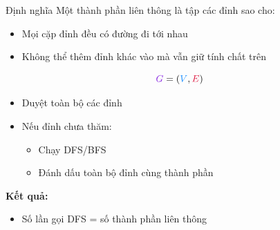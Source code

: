 \documentclass{beamer}
\title{\hlred{Thành phần liên thông}}
\author{Group 3}
\date{\hlcyan{03/2026}}
\newcommand{\hlblue}[1]{\textcolor{myblue}{#1}}
\newcommand{\hlgreen}[1]{\textcolor{mygreen}{#1}}
\newcommand{\hlred}[1]{\textcolor{myred}{#1}}
\newcommand{\hlpurple}[1]{\textcolor{mypurple}{#1}}
\begin{document}
\frame{\titlepage}

\begin{frame}{}
\begin{block}{\hlgreen{Định nghĩa}}
Một \hlblue{thành phần liên thông} là tập các đỉnh sao cho:
\begin{itemize}
\item Mọi cặp đỉnh đều \hlred{có đường đi} tới nhau
\item Không thể thêm đỉnh khác vào mà vẫn giữ tính chất trên
\end{itemize}
\end{block}

\medskip
\[
\hlpurple{G} = (\hlblue{V}, \hlred{E})
\]

\end{frame}

\begin{frame}{}
\centering
{}
\end{frame}

\begin{frame}{}
\begin{itemize}
\item Duyệt toàn bộ các đỉnh
\item Nếu đỉnh chưa thăm:
\begin{itemize}
\item Chạy \hlblue{DFS/BFS}
\item Đánh dấu toàn bộ đỉnh cùng thành phần
\end{itemize}
\end{itemize}

\medskip
\textbf{Kết quả:}
\begin{itemize}
\item Số lần gọi DFS = số thành phần liên thông
\end{itemize}
\end{frame}
\end{document}
